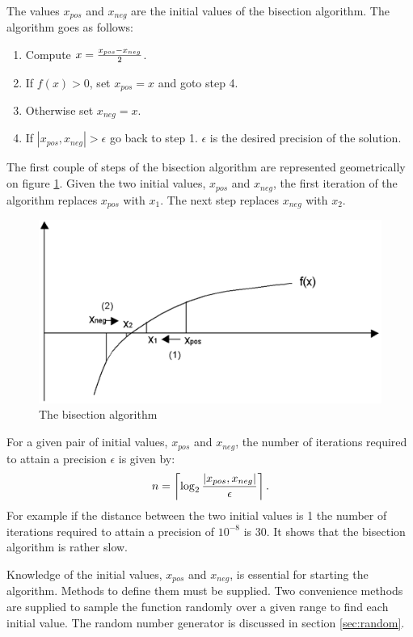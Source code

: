 The values $x_{pos}$ and $x_{neg}$ are
the initial values of the bisection algorithm. The algorithm goes
as follows:
\begin{enumerate}
  \item Compute $x={x_{pos}-x_{neg}\over2}$.
  \item If $f\left(x\right)>0$, set $x_{pos}=x$ and
  goto step 4.
  \item Otherwise set $x_{neg}=x$.
  \item If $\left|x_{pos},x_{neg}\right|>\epsilon$ go back
to step 1. $\epsilon$ is the desired precision of the solution.
\end{enumerate}
The first couple of steps of the bisection algorithm are
represented geometrically on figure \ref{fig:bisection}. Given the
two initial values, $x_{pos}$ and $x_{neg}$, the first iteration of the algorithm replaces $x_{pos}$ with $x_1$. The next step replaces $x_{neg}$ with $x_2$.
\begin{figure}
\centering\includegraphics[width=12cm]{Figures/BissectionGraph}
\caption{The bisection algorithm}\label{fig:bisection}
\end{figure}

For a given pair of initial values, $x_{pos}$ and $x_{neg}$, the number of iterations required to attain a precision $\epsilon$ is given by:
\begin{equation}
\label{eq:bissectime}
  n=\left\lceil\log_2{\displaystyle\left| x_{pos},x_{neg}\right| \over
\displaystyle\epsilon}\right\rceil.
\end{equation}
For example if the distance between the two initial values is 1
the number of iterations required to attain a precision of
$10^{-8}$ is 30. It shows that the bisection algorithm is rather
slow.

Knowledge of the initial values, $x_{pos}$ and $x_{neg}$, is essential for starting the algorithm.
Methods to define them must be supplied. Two convenience methods
are supplied to sample the function randomly over a given range to
find each initial value. The random number generator is discussed
in section \ref{sec:random}.

